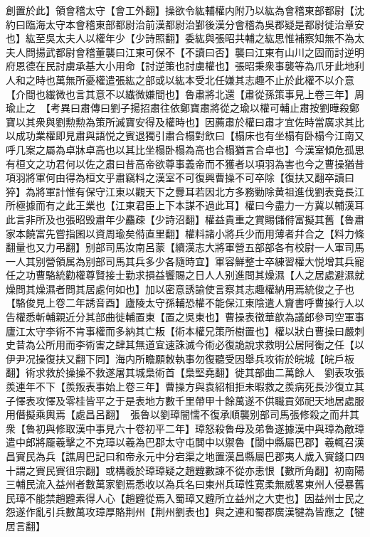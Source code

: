 創置於此】領會稽太守【會工外翻】操欲令紘輔權内附乃以紘為會稽東部都尉【沈約曰臨海太守本會稽東部都尉治前漢都尉治鄞後漢分會稽為吳郡疑是都尉徙治章安也】紘至吳太夫人以權年少【少詩照翻】委紘與張昭共輔之紘思惟補察知無不為太夫人問揚武都尉會稽董襲曰江東可保不【不讀曰否】襲曰江東有山川之固而討逆明府恩德在民討虜承基大小用命【討逆策也討虜權也】張昭秉衆事襲等為爪牙此地利人和之時也萬無所憂權遣張紘之部或以紘本受北任嫌其志趣不止於此權不以介意【介間也纎微也言其意不以纎微嫌間也】魯肅將北還【肅從孫策事見上卷三年】周瑜止之　【考異曰肅傳曰劉子揚招肅往依鄭寶肅將從之瑜以權可輔止肅按劉曄殺鄭寶以其衆與劉勲勲為策所滅寶安得及權時也】因薦肅於權曰肅才宜佐時當廣求其比以成功業權即見肅與語悦之賓退獨引肅合榻對飲曰【榻床也有坐榻有卧榻今江南又呼几案之屬為卓牀卓高也以其比坐榻卧榻為高也合榻猶言合卓也】今漢室傾危孤思有桓文之功君何以佐之肅曰昔高帝欲尊事義帝而不獲者以項羽為害也今之曹操猶昔項羽將軍何由得為桓文乎肅竊料之漢室不可復興曹操不可卒除【復扶又翻卒讀曰猝】為將軍計惟有保守江東以觀天下之釁耳若因北方多務勦除黄祖進伐劉表竟長江所極據而有之此王業也【江東君臣上下本謀不過此耳】權曰今盡力一方冀以輔漢耳此言非所及也張昭毁肅年少麤疎【少詩沼翻】權益貴重之賞賜儲偫富擬其舊【魯肅家本饒富先嘗指囷以資周瑜矣偫直里翻】權料諸小將兵少而用薄者幷合之【料力條翻量也又力弔翻】别部司馬汝南呂蒙【續漢志大將軍營五部部各有校尉一人軍司馬一人其别營領属為别部司馬其兵多少各隨時宜】軍容鮮整士卒練習權大悦增其兵寵任之功曹駱統勸權尊賢接士勤求損益饗賜之日人人别進問其燥濕【人之居處避濕就燥問其燥濕者問其居處何如也】加以密意誘諭使言察其志趣權納用焉統俊之子也【駱俊見上卷二年誘音酉】廬陵太守孫輔恐權不能保江東陰遣人齎書呼曹操行人以告權悉斬輔親近分其部曲徙輔置東【置之吳東也】曹操表徵華歆為議郎參司空軍事廬江太守李術不肯事權而多納其亡叛【術本權兄策所樹置也】權以狀白曹操曰嚴刺史昔為公所用而李術害之肆其無道宜速誅滅今術必復詭說求救明公居阿衡之任【以伊尹况操復扶又翻下同】海内所瞻願敇執事勿復聽受因舉兵攻術於皖城【皖戶板翻】術求救於操操不救遂屠其城梟術首【梟堅堯翻】徙其部曲二萬餘人　劉表攻張羨連年不下【羨叛表事始上卷三年】曹操方與袁紹相拒未暇救之羨病死長沙復立其子懌表攻懌及零桂皆平之于是表地方數千里帶甲十餘萬遂不供職貢郊祀天地居處服用僭擬乘輿焉【處昌呂翻】　張魯以劉璋闇懦不復承順襲别部司馬張修殺之而幷其衆【魯初與修取漢中事見六十卷初平二年】璋怒殺魯母及弟魯遂據漢中與璋為敵璋遣中郎將龎羲擊之不克璋以羲為巴郡太守屯䦘中以禦魯【閬中縣屬巴郡】羲輒召漢昌賨民為兵【譙周巴記曰和帝永元中分宕渠之地置漢昌縣屬巴郡夷人歲入賨錢口四十謂之賨民賨徂宗翻】或構羲於璋璋疑之趙韙數諫不從亦恚恨【數所角翻】初南陽三輔民流入益州者數萬家劉焉悉收以為兵名曰東州兵璋性寛柔無威畧東州人侵暴舊民璋不能禁趙韙素得人心【趙韙從焉入蜀璋又韙所立益州之大吏也】因益州士民之怨遂作亂引兵數萬攻璋厚賂荆州【荆州劉表也】與之連和蜀郡廣漢犍為皆應之【犍居言翻】

